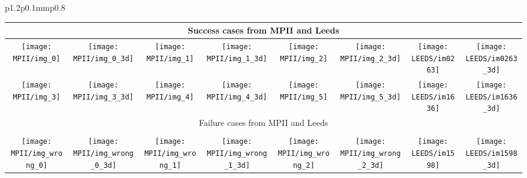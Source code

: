 \documentclass[10pt,twocolumn,letterpaper]{article}
\begin{document}
\begin{figure*}[tbp]
\begin{tabular}{p{}p{0.1mm}p{}}
\begin{center}
\setlength{\tabcolsep}{1pt}
  \begin{tabular}{cccccccc}
    \multicolumn{8}{c}{ Success cases from MPII and Leeds}\\
    \toprule
\texttt{[image: MPII/img\_0]}    & 
\texttt{[image: MPII/img\_0\_3d]} & 
\texttt{[image: MPII/img\_1]}    & 
\texttt{[image: MPII/img\_1\_3d]} & 
\texttt{[image: MPII/img\_2]}    & 
\texttt{[image: MPII/img\_2\_3d]} &
\texttt{[image: LEEDS/im0263]}  &
\texttt{[image: LEEDS/im0263\_3d]} \\
\texttt{[image: MPII/img\_3]}    & 
\texttt{[image: MPII/img\_3\_3d]} & 
\texttt{[image: MPII/img\_4]}    & 
\texttt{[image: MPII/img\_4\_3d]} & 
\texttt{[image: MPII/img\_5]}    & 
\texttt{[image: MPII/img\_5\_3d]} &
\texttt{[image: LEEDS/im1636]} &
\texttt{[image: LEEDS/im1636\_3d]} \\

\multicolumn{8}{c}{Failure cases from MPII and Leeds}\\
\toprule
\\  
\texttt{[image: MPII/img\_wrong\_0]}    & 
\texttt{[image: MPII/img\_wrong\_0\_3d]} & 
\texttt{[image: MPII/img\_wrong\_1]}    & 
\texttt{[image: MPII/img\_wrong\_1\_3d]} & 
\texttt{[image: MPII/img\_wrong\_2]}    & 
\texttt{[image: MPII/img\_wrong\_2\_3d]} &
\texttt{[image: LEEDS/im1598]}    & 
\texttt{[image: LEEDS/im1598\_3d]} \\
\end{tabular}
\end{center}
\end{tabular}
\vspace{-5mm}
\caption{\small {\bf Left:} Results from the Human3.6M dataset. The identified 2D
  landmark positions and 3D skeleton is shown for each pose taken from
  different actions: Walking, Phoning, Greeting, Discussion, Sitting
  Down.\label{fig:Results} {\bf Right:} Results on images from the
  MPII~\cite{Andriluka:etal:CVPR:2014} (columns 1 to 3) and Leeds~\cite{Johnson10}
  datasets (last column). The  model was not trained on images as diverse as those contained in
  these datasets, however it often retrieves correct 2D and 3D joint positions. The last row
  shows example cases where the method fails either in the
  identification of 2D or 3D landmarks.\label{fig:Results_mpii}}\vspace{-5mm}
\end{figure*}
\end{document}
